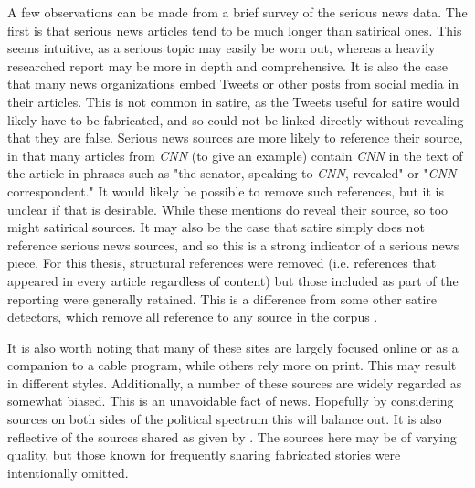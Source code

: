 \documentclass [12 pt] {report}
\begin{document}
A few observations can be made from a brief survey of the serious news data. The first is that serious news articles tend to be much longer than satirical ones. This seems intuitive, as a serious topic may easily be worn out, whereas a heavily researched report may be more in depth and comprehensive. It is also the case that many news organizations embed Tweets or other posts from social media in their articles. This is not common in satire, as the Tweets useful for satire would likely have to be fabricated, and so could not be linked directly without revealing that they are false. Serious news sources are more likely to reference their source, in that many articles from \textit{CNN} (to give an example) contain \textit{CNN} in the text of the article in phrases such as "the senator, speaking to \textit{CNN}, revealed" or "\textit{CNN} correspondent." It would likely be possible to remove such references, but it is unclear if that is desirable. While these mentions do reveal their source, so too might satirical sources. It may also be the case that satire simply does not reference serious news sources, and so this is a strong indicator of a serious news piece. For this thesis, structural references were removed (i.e. references that appeared in every article regardless of content) but those included as part of the reporting were generally retained. This is a difference from some other satire detectors, which remove all reference to any source in the corpus \cite{Yang}.

It is also worth noting that many of these sites are largely focused online or as a companion to a cable program, while others rely more on print. This may result in different styles. Additionally, a number of these sources are widely regarded as somewhat biased. This is an unavoidable fact of news. Hopefully by considering sources on both sides of the political spectrum this will balance out. It is also reflective of the sources shared as given by \cite{topNews}. The sources here may be of varying quality, but those known for frequently sharing fabricated stories were intentionally omitted.
\end{document}
